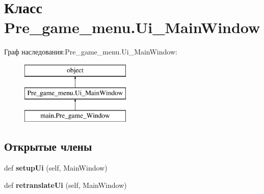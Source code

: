 \hypertarget{class_pre__game__menu_1_1_ui___main_window}{}\section{Класс Pre\+\_\+game\+\_\+menu.\+Ui\+\_\+\+Main\+Window}
\label{class_pre__game__menu_1_1_ui___main_window}
Граф наследования\+:Pre\+\_\+game\+\_\+menu.\+Ui\+\_\+\+Main\+Window\+:\begin{figure}[H]
\begin{center}
\leavevmode
\includegraphics[height=3.000000cm]{class_pre__game__menu_1_1_ui___main_window}
\end{center}
\end{figure}
\subsection*{Открытые члены}
\begin{DoxyCompactItemize}
\item 
\mbox{\label{class_pre__game__menu_1_1_ui___main_window_a395d1f316eff50bb23a1a5e953d4b7b3}} 
def {\bfseries setup\+Ui} (self, Main\+Window)
\item 
\mbox{\label{class_pre__game__menu_1_1_ui___main_window_a0cc494fc7f6085539f3eb5a0f8eb0725}} 
def {\bfseries retranslate\+Ui} (self, Main\+Window)
\end{DoxyCompactItemize}
